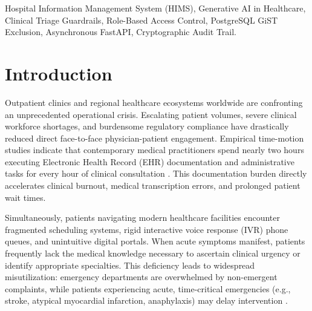 \documentclass[conference]{IEEEtran}
\begin{document}
\begin{IEEEkeywords}
Hospital Information Management System (HIMS), Generative AI in Healthcare, Clinical Triage Guardrails, Role-Based Access Control, PostgreSQL GiST Exclusion, Asynchronous FastAPI, Cryptographic Audit Trail.
\end{IEEEkeywords}

\section{Introduction}
\label{sec:intro}
Outpatient clinics and regional healthcare ecosystems worldwide are confronting an unprecedented operational crisis. Escalating patient volumes, severe clinical workforce shortages, and burdensome regulatory compliance have drastically reduced direct face-to-face physician-patient engagement. Empirical time-motion studies indicate that contemporary medical practitioners spend nearly two hours executing Electronic Health Record (EHR) documentation and administrative tasks for every hour of clinical consultation \cite{rajkomar2019machine}. This documentation burden directly accelerates clinical burnout, medical transcription errors, and prolonged patient wait times.

Simultaneously, patients navigating modern healthcare facilities encounter fragmented scheduling systems, rigid interactive voice response (IVR) phone queues, and unintuitive digital portals. When acute symptoms manifest, patients frequently lack the medical knowledge necessary to ascertain clinical urgency or identify appropriate specialties. This deficiency leads to widespread misutilization: emergency departments are overwhelmed by non-emergent complaints, while patients experiencing acute, time-critical emergencies (e.g., stroke, atypical myocardial infarction, anaphylaxis) may delay intervention \cite{mackway2014emergency}.
\end{document}
